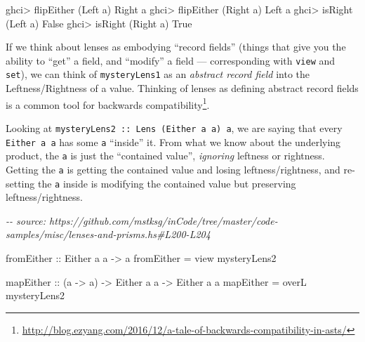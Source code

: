 \documentclass[]{article}
\newenvironment{Shaded}{}{}
\newcommand{\CharTok}[1]{\textcolor[rgb]{0.25,0.44,0.63}{#1}}
\newcommand{\CommentTok}[1]{\textcolor[rgb]{0.38,0.63,0.69}{\textit{#1}}}
\newcommand{\DataTypeTok}[1]{\textcolor[rgb]{0.56,0.13,0.00}{#1}}
\newcommand{\NormalTok}[1]{#1}
\newcommand{\OperatorTok}[1]{\textcolor[rgb]{0.40,0.40,0.40}{#1}}
\newcommand{\OtherTok}[1]{\textcolor[rgb]{0.00,0.44,0.13}{#1}}
\renewcommand{\href}[2]{#2\footnote{\url{#1}}}
\begin{document}
\begin{Shaded}
\begin{Highlighting}[]
\NormalTok{ghci}\OperatorTok{>}\NormalTok{ flipEither (}\DataTypeTok{Left} \CharTok{\textquotesingle{}a\textquotesingle{}}\NormalTok{)}
\DataTypeTok{Right} \CharTok{\textquotesingle{}a\textquotesingle{}}
\NormalTok{ghci}\OperatorTok{>}\NormalTok{ flipEither (}\DataTypeTok{Right} \CharTok{\textquotesingle{}a\textquotesingle{}}\NormalTok{)}
\DataTypeTok{Left} \CharTok{\textquotesingle{}a\textquotesingle{}}
\NormalTok{ghci}\OperatorTok{>}\NormalTok{ isRight (}\DataTypeTok{Left} \CharTok{\textquotesingle{}a\textquotesingle{}}\NormalTok{)}
\DataTypeTok{False}
\NormalTok{ghci}\OperatorTok{>}\NormalTok{ isRight (}\DataTypeTok{Right} \CharTok{\textquotesingle{}a\textquotesingle{}}\NormalTok{)}
\DataTypeTok{True}
\end{Highlighting}
\end{Shaded}

If we think about lenses as embodying ``record fields'' (things that give you
the ability to ``get'' a field, and ``modify'' a field --- corresponding with
\texttt{view} and \texttt{set}), we can think of \texttt{mysteryLens1} as an
\emph{abstract record field} into the Leftness/Rightness of a value. Thinking of
lenses as defining abstract record fields is a
\href{http://blog.ezyang.com/2016/12/a-tale-of-backwards-compatibility-in-asts/}{common
tool for backwards compatibility}.

Looking at \texttt{mysteryLens2\ ::\ Lens\textquotesingle{}\ (Either\ a\ a)\ a},
we are saying that every \texttt{Either\ a\ a} has some \texttt{a} ``inside''
it. From what we know about the underlying product, the \texttt{a} is just the
``contained value'', \emph{ignoring} leftness or rightness. Getting the
\texttt{a} is getting the contained value and losing leftness/rightness, and
re-setting the \texttt{a} inside is modifying the contained value but preserving
leftness/rightness.

\begin{Shaded}
\begin{Highlighting}[]
\CommentTok{{-}{-} source: https://github.com/mstksg/inCode/tree/master/code{-}samples/misc/lenses{-}and{-}prisms.hs\#L200{-}L204}

\OtherTok{fromEither ::} \DataTypeTok{Either}\NormalTok{ a a }\OtherTok{{-}>}\NormalTok{ a}
\NormalTok{fromEither }\OtherTok{=}\NormalTok{ view mysteryLens2}

\OtherTok{mapEither ::}\NormalTok{ (a }\OtherTok{{-}>}\NormalTok{ a) }\OtherTok{{-}>} \DataTypeTok{Either}\NormalTok{ a a }\OtherTok{{-}>} \DataTypeTok{Either}\NormalTok{ a a}
\NormalTok{mapEither }\OtherTok{=}\NormalTok{ overL mysteryLens2}
\end{Highlighting}
\end{Shaded}
\end{document}
